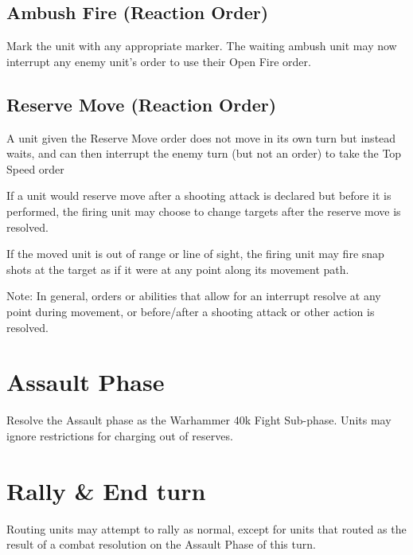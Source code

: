 \documentclass[letterpaper,twocolumn,oneside,titlepage]{book}
\begin{document}
\subsection{\texorpdfstring{\textbf{Ambush Fire (Reaction
Order)}}{Ambush Fire (Reaction Order)}}\label{ambush-fire-reaction-order}

Mark the unit with any appropriate marker. The waiting ambush unit may
now interrupt any enemy unit's order to use their Open Fire order.

\subsection{\texorpdfstring{\textbf{Reserve Move (Reaction
Order)}}{Reserve Move (Reaction Order)}}\label{reserve-move-reaction-order}

A unit given the Reserve Move order does not move in its own turn but
instead waits, and can then interrupt the enemy turn (but not an order)
to take the Top Speed order

If a unit would reserve move after a shooting attack is declared but
before it is performed, the firing unit may choose to change targets
after the reserve move is resolved.

If the moved unit is out of range or line of sight, the firing unit may
fire snap shots at the target as if it were at any point along its
movement path.

Note: In general, orders or abilities that allow for an interrupt
resolve at any point during movement, or before/after a shooting attack
or other action is resolved.

\section{\texorpdfstring{\textbf{Assault
Phase}}{Assault Phase}}\label{assault-phase}

Resolve the Assault phase as the Warhammer 40k Fight Sub-phase. Units
may ignore restrictions for charging out of reserves.

\section{\texorpdfstring{\textbf{Rally \& End
turn}}{Rally \& End turn}}\label{rally-end-turn}

Routing units may attempt to rally as normal, except for units that
routed as the result of a combat resolution on the Assault Phase of this
turn.
\end{document}
